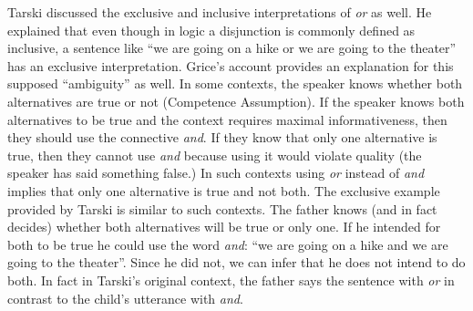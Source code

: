 \documentclass[oneside]{report}
\theoremstyle{definition}
\theoremstyle{definition}
\theoremstyle{definition}
\theoremstyle{remark}
\begin{document}
Tarski discussed the exclusive and inclusive interpretations of
\emph{or} as well. He explained that even though in logic a disjunction
is commonly defined as inclusive, a sentence like ``we are going on a
hike or we are going to the theater'' has an exclusive interpretation.
Grice's account provides an explanation for this supposed ``ambiguity''
as well. In some contexts, the speaker knows whether both alternatives
are true or not (Competence Assumption). If the speaker knows both
alternatives to be true and the context requires maximal
informativeness, then they should use the connective \emph{and}. If they
know that only one alternative is true, then they cannot use \emph{and}
because using it would violate quality (the speaker has said something
false.) In such contexts using \emph{or} instead of \emph{and} implies
that only one alternative is true and not both. The exclusive example
provided by Tarski is similar to such contexts. The father knows (and in
fact decides) whether both alternatives will be true or only one. If he
intended for both to be true he could use the word \emph{and}: ``we are
going on a hike and we are going to the theater''. Since he did not, we
can infer that he does not intend to do both. In fact in Tarski's
original context, the father says the sentence with \emph{or} in
contrast to the child's utterance with \emph{and}.
\end{document}
